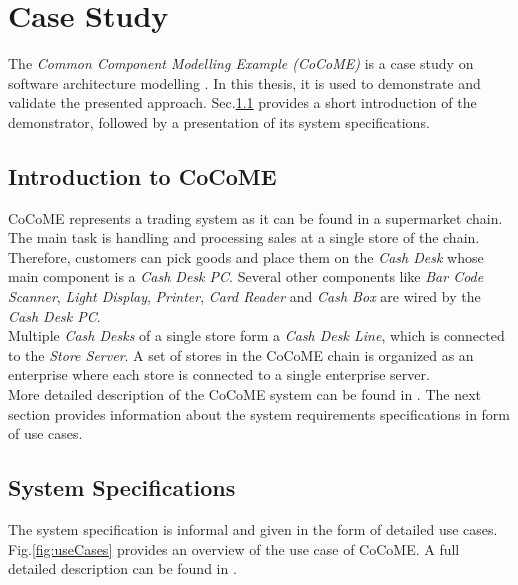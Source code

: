 \chapter{Case Study}
\label{ch:CoCoME}
The \textit{Common Component Modelling Example (CoCoME)} is a case study on software architecture modelling \cite{CoCoMEOld}\cite{CoCoMETechnical}. In this thesis, it is used to demonstrate and validate the presented approach. Sec.\ref{sec:CoCoME:Introduction} provides a short introduction of the demonstrator, followed by a presentation of its system specifications.


\section{Introduction to CoCoME}
\label{sec:CoCoME:Introduction}
CoCoME represents a trading system as it can be found in a supermarket chain. The main task is handling and processing sales at a single store of the chain. Therefore, customers can pick goods and place them on the \textit{Cash Desk} whose main component is a \textit{Cash Desk PC}. Several other components like \textit{Bar Code Scanner}, \textit{Light Display}, \textit{Printer}, \textit{Card Reader} and \textit{Cash Box} are wired by the  \textit{Cash Desk PC}. \\
Multiple  \textit{Cash Desks} of a single store form a  \textit{Cash Desk Line}, which is connected to the  \textit{Store Server}. A set of stores in the CoCoME chain is organized as an enterprise where each store is connected to a single enterprise server. \\
More detailed description of the CoCoME system can be found in \cite{CoCoMEOld}\cite{CoCoMETechnical}. The next section provides information about the system requirements specifications in form of use cases.
 


\section{System Specifications}
\label{sec:CoCoME:systemSpecifications}
The system specification is informal and given in the form of detailed use cases. Fig.\ref{fig:useCases} provides an overview of the use case of CoCoME. A full detailed description can be found in \cite{CoCoMEOld}.




